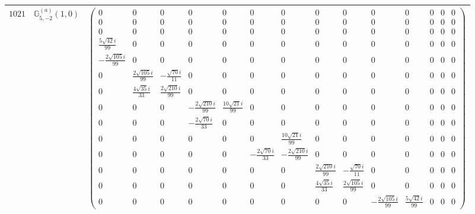 \documentclass[fleqn,8pt,landscape]{jsarticle}
\begin{document}
\begin{center}
\begin{longtable}{ccc}
$ 1021 $ & $ \mathbb{G}_{5,-2}^{(a)}(1,0) $ & $ \begin{pmatrix} 0 & 0 & 0 & 0 & 0 & 0 & 0 & 0 & 0 & 0 & 0 & 0 & 0 & 0 \\ 0 & 0 & 0 & 0 & 0 & 0 & 0 & 0 & 0 & 0 & 0 & 0 & 0 & 0 \\ 0 & 0 & 0 & 0 & 0 & 0 & 0 & 0 & 0 & 0 & 0 & 0 & 0 & 0 \\ \frac{5 \sqrt{42} i}{99} & 0 & 0 & 0 & 0 & 0 & 0 & 0 & 0 & 0 & 0 & 0 & 0 & 0 \\ - \frac{2 \sqrt{105} i}{99} & 0 & 0 & 0 & 0 & 0 & 0 & 0 & 0 & 0 & 0 & 0 & 0 & 0 \\ 0 & \frac{2 \sqrt{105} i}{99} & - \frac{\sqrt{70} i}{11} & 0 & 0 & 0 & 0 & 0 & 0 & 0 & 0 & 0 & 0 & 0 \\ 0 & \frac{4 \sqrt{35} i}{33} & \frac{2 \sqrt{210} i}{99} & 0 & 0 & 0 & 0 & 0 & 0 & 0 & 0 & 0 & 0 & 0 \\ 0 & 0 & 0 & - \frac{2 \sqrt{210} i}{99} & \frac{10 \sqrt{21} i}{99} & 0 & 0 & 0 & 0 & 0 & 0 & 0 & 0 & 0 \\ 0 & 0 & 0 & - \frac{2 \sqrt{70} i}{33} & 0 & 0 & 0 & 0 & 0 & 0 & 0 & 0 & 0 & 0 \\ 0 & 0 & 0 & 0 & 0 & 0 & \frac{10 \sqrt{21} i}{99} & 0 & 0 & 0 & 0 & 0 & 0 & 0 \\ 0 & 0 & 0 & 0 & 0 & - \frac{2 \sqrt{70} i}{33} & - \frac{2 \sqrt{210} i}{99} & 0 & 0 & 0 & 0 & 0 & 0 & 0 \\ 0 & 0 & 0 & 0 & 0 & 0 & 0 & \frac{2 \sqrt{210} i}{99} & - \frac{\sqrt{70} i}{11} & 0 & 0 & 0 & 0 & 0 \\ 0 & 0 & 0 & 0 & 0 & 0 & 0 & \frac{4 \sqrt{35} i}{33} & \frac{2 \sqrt{105} i}{99} & 0 & 0 & 0 & 0 & 0 \\ 0 & 0 & 0 & 0 & 0 & 0 & 0 & 0 & 0 & - \frac{2 \sqrt{105} i}{99} & \frac{5 \sqrt{42} i}{99} & 0 & 0 & 0 \end{pmatrix} $ \\ \hline

\end{longtable}
\end{center}
\end{document}
